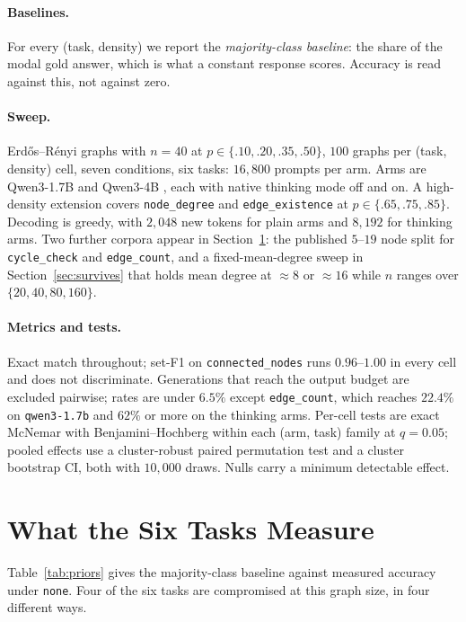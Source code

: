 \documentclass[11pt]{article}
\begin{document}
\paragraph{Baselines.} For every (task, density) we report the
\emph{majority-class baseline}: the share of the modal gold answer, which is
what a constant response scores. Accuracy is read against this, not against
zero.

\paragraph{Sweep.} Erd\H{o}s--R\'enyi graphs \citep{erdosrenyi1959random} with
$n{=}40$ at $p\in\{.10,.20,.35,.50\}$, $100$ graphs per (task, density) cell,
seven conditions, six tasks: $16{,}800$ prompts per arm. Arms are Qwen3-1.7B
and Qwen3-4B \citep{qwen2025qwen3}, each with native thinking mode off and on.
A high-density extension covers \texttt{node\_degree} and
\texttt{edge\_existence} at $p\in\{.65,.75,.85\}$. Decoding is greedy, with
$2{,}048$ new tokens for plain arms and $8{,}192$ for thinking arms. Two
further corpora appear in Section~\ref{sec:tasks}: the published $5$--$19$ node
split for \texttt{cycle\_check} and \texttt{edge\_count}, and a
fixed-mean-degree sweep in Section~\ref{sec:survives} that holds mean degree at
$\approx 8$ or $\approx 16$ while $n$ ranges over $\{20,40,80,160\}$.

\paragraph{Metrics and tests.} Exact match throughout; set-F1 on
\texttt{connected\_nodes} runs $0.96$--$1.00$ in every cell and does not
discriminate. Generations that reach the output budget are excluded pairwise;
rates are under $6.5\%$ except \texttt{edge\_count}, which reaches $22.4\%$ on
\texttt{qwen3-1.7b} and $62\%$ or more on the thinking arms. Per-cell tests are
exact McNemar with Benjamini--Hochberg within each (arm, task) family at
$q{=}0.05$; pooled effects use a cluster-robust paired permutation test and a
cluster bootstrap CI, both with $10{,}000$ draws. Nulls carry a minimum
detectable effect.



\section{What the Six Tasks Measure}
\label{sec:tasks}

Table~\ref{tab:priors} gives the majority-class baseline against measured
accuracy under \texttt{none}. Four of the six tasks are compromised at this
graph size, in four different ways.
\end{document}
